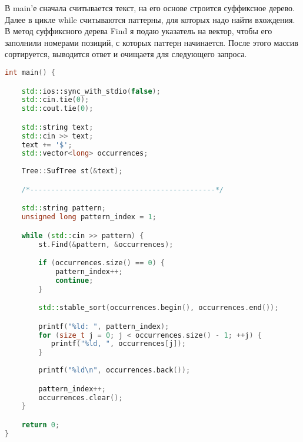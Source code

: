 В main'е сначала считывается текст, на его основе строится суффиксное дерево. Далее в цикле while считываются паттерны, для которых надо найти вхождения. В метод суффиксного дерева Find я подаю указатель на вектор, чтобы его заполнили номерами позиций, с которых паттерн начинается. После этого массив сортируется, выводится ответ и очищаетя для следующего запроса. 

\begin{lstlisting}[language=c++]
int main() {

    std::ios::sync_with_stdio(false);
    std::cin.tie(0);
    std::cout.tie(0);

    std::string text;
    std::cin >> text;
    text += '$';
    std::vector<long> occurrences;
    
    Tree::SufTree st(&text);

    /*--------------------------------------------*/

    std::string pattern;
    unsigned long pattern_index = 1;

    while (std::cin >> pattern) {
        st.Find(&pattern, &occurrences);

        if (occurrences.size() == 0) {
            pattern_index++;
            continue;
        }

        std::stable_sort(occurrences.begin(), occurrences.end());

        printf("%ld: ", pattern_index);
        for (size_t j = 0; j < occurrences.size() - 1; ++j) {
           printf("%ld, ", occurrences[j]);
        }
        
        printf("%ld\n", occurrences.back());

        pattern_index++;
        occurrences.clear();
    }

    return 0;
}
\end{lstlisting}

